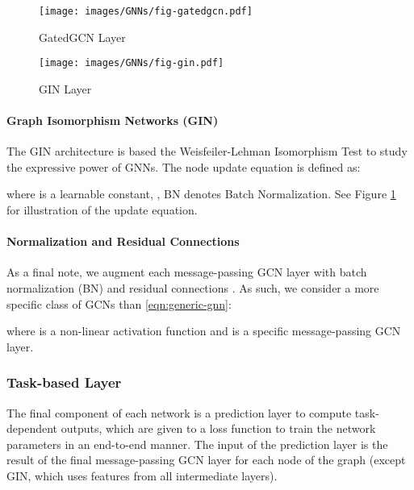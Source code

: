 \documentclass{article}
\begin{document}
\begin{figure}[t!]
\centering
\begin{minipage}{.5\textwidth}
\centering
  \texttt{[image: images/GNNs/fig-gatedgcn.pdf]}
  \caption{GatedGCN Layer}
  \label{fig:gatedgcn}
\end{minipage}\begin{minipage}{.5\textwidth}
\centering
  \texttt{[image: images/GNNs/fig-gin.pdf]}
  \caption{GIN Layer}
  \label{fig:gin}
\end{minipage}\end{figure}






\paragraph{Graph Isomorphism Networks (GIN) \cite{xu2018how}}
The GIN architecture is based the Weisfeiler-Lehman Isomorphism Test \cite{weisfeiler1968reduction} to study the expressive power of GNNs. 
The node update equation is defined as:

where  is a learnable constant, , BN denotes Batch Normalization. See Figure \ref{fig:gin} for illustration of the update equation.



\paragraph{Normalization and Residual Connections}
As a final note, we augment each message-passing GCN layer with batch normalization (BN) \cite{ioffe2015batch} and residual connections \cite{He_2016_CVPR}. 
As such, we consider a more specific class of GCNs than \eqref{eqn:generic-gnn}:

where  is a non-linear activation function and  is a specific message-passing GCN layer. 







\subsubsection{Task-based Layer}
\label{sec:mpgcns_task_network}
The final component of each network is a prediction layer to compute task-dependent outputs, which are given to a loss function to train the network parameters in an end-to-end manner. The input of the prediction layer is the result of the final message-passing GCN layer for each node of the graph (except GIN, which uses features from all intermediate layers). 
\end{document}
